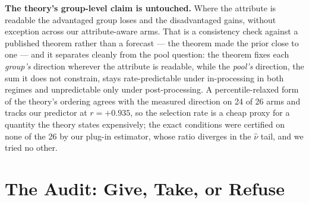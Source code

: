\documentclass[conference]{IEEEtran}
\begin{document}
\textbf{The theory's group-level claim is untouched.} Where the attribute is readable the
advantaged group loses and the disadvantaged gains, without exception across our
attribute-aware arms. That is a consistency check against a published theorem rather than a
forecast --- the theorem made the prior close to one --- and it separates cleanly from the
pool question: the theorem fixes each \emph{group's} direction wherever the attribute is
readable, while the \emph{pool's} direction, the sum it does not constrain, stays
rate-predictable under in-processing in both regimes and unpredictable only under
post-processing. A percentile-relaxed form of the theory's ordering agrees with the measured
direction on 24 of 26 arms and tracks our predictor at $r = +0.935$, so the selection rate is
a cheap proxy for a quantity the theory states expensively; the exact conditions were
certified on none of the 26 by our plug-in estimator, whose ratio diverges in the $\hat\nu$
tail, and we tried no other.

\section{The Audit: Give, Take, or Refuse}
\label{sec:procedure}
\end{document}
